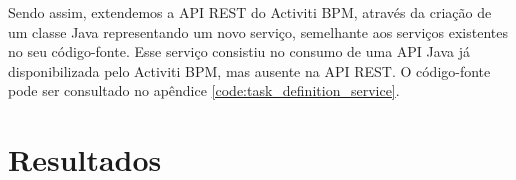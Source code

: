 Sendo assim, extendemos a API REST do Activiti BPM, através da criação de um classe Java representando um novo serviço, semelhante aos serviços existentes no seu código-fonte. Esse serviço consistiu no consumo de uma API Java já disponibilizada pelo Activiti BPM, mas ausente na API REST. O código-fonte pode ser consultado no apêndice \ref{code:task_definition_service}.

\section{Resultados}\label{sec:integracao_redmine_activiti-resultados}